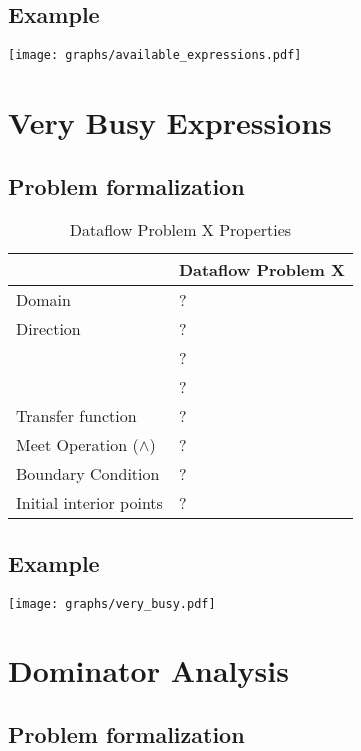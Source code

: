 \documentclass{article}
\begin{document}
\subsection{Example}

\texttt{[image: graphs/available\_expressions.pdf]}

\section{Very Busy Expressions}

\subsection{Problem formalization}

\begin{table}[H]
\centering
\begin{tabular}{|p{}|p{}|}
\hline
 & \textbf{Dataflow Problem X} \\
\hline
Domain & ? \\
\hline
Direction & ? \\
 & ? \\
 & ? \\
\hline
Transfer function & ? \\
\hline
Meet Operation ($\wedge$) & ? \\
\hline
Boundary Condition & ? \\
\hline
Initial interior points & ? \\
\hline
\end{tabular}
\caption{Dataflow Problem X Properties}
\label{tab:dataflow_problem_x}
\end{table}

\subsection{Example}

\texttt{[image: graphs/very\_busy.pdf]}

\section{Dominator Analysis}

\subsection{Problem formalization}
\end{document}
